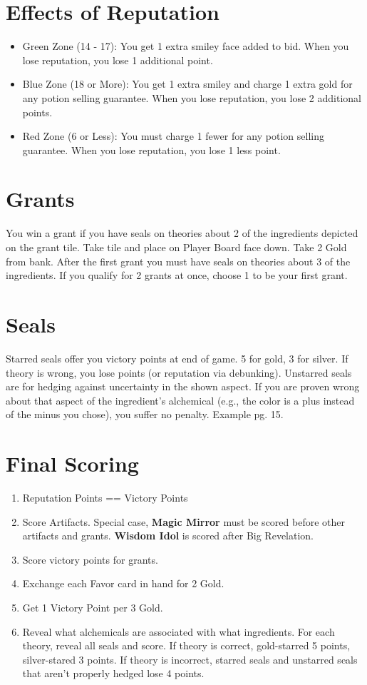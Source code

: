 \documentclass[12pt]{article}
\newenvironment{enumerateCustom}
{\begin{enumerate}
  \setlength{\itemsep}{1pt}
  \setlength{\parskip}{0pt}
  \setlength{\parsep}{0pt}}
{\end{enumerate}}
\newenvironment{itemizeCustom}
{\begin{itemize}
  \setlength{\itemsep}{1pt}
  \setlength{\parskip}{0pt}
  \setlength{\parsep}{0pt}}
{\end{itemize}}
\begin{document}
\begin{multicols*}{2}
\section*{Effects of Reputation}
\begin{itemizeCustom}
    \item Green Zone (14 - 17): You get 1 extra smiley face added to bid. When you lose reputation, you lose 1 additional point.
    \item Blue Zone (18 or More): You get 1 extra smiley and charge 1 extra gold for any potion selling guarantee. When you lose reputation, you lose 2 additional points.
    \item Red Zone (6 or Less): You must charge 1 fewer for any potion selling guarantee. When you lose reputation, you lose 1 less point.
\end{itemizeCustom}


\section*{Grants}
You win a grant if you have seals on theories about 2 of the ingredients depicted on the grant tile. Take tile and place on Player Board face down. Take 2 Gold from bank. After the first grant you must have seals on theories about 3 of the ingredients. If you qualify for 2 grants at once, choose 1 to be your first grant.

\section*{Seals}
Starred seals offer you victory points at end of game. 5 for gold, 3 for silver. If theory is wrong, you lose points (or reputation via debunking). Unstarred seals are for hedging against uncertainty in the shown aspect. If you are proven wrong about that aspect of the ingredient's alchemical (e.g., the color is a plus instead of the minus you chose), you suffer no penalty. Example pg. 15.

\section*{Final Scoring}
\begin{enumerateCustom}
    \item Reputation Points == Victory Points
    \item Score Artifacts. Special case, \textbf{Magic Mirror} must be scored before other artifacts and grants. \textbf{Wisdom Idol} is scored after Big Revelation.
    \item Score victory points for grants.
    \item Exchange each Favor card in hand for 2 Gold.
    \item Get 1 Victory Point per 3 Gold.
    \item Reveal what alchemicals are associated with what ingredients. For each theory, reveal all seals and score. If theory is correct, gold-starred 5 points, silver-stared 3 points. If theory is incorrect, starred seals and unstarred seals that aren't properly hedged lose 4 points.
\end{enumerateCustom}


\end{multicols*}
\end{document}
